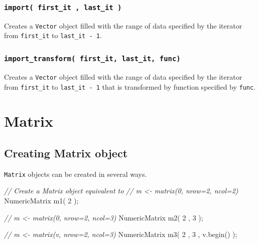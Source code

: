 \documentclass[]{book}
\newenvironment{Shaded}{\begin{snugshade}}{\end{snugshade}}
\newcommand{\CommentTok}[1]{\textcolor[rgb]{0.56,0.35,0.01}{\textit{#1}}}
\newcommand{\DecValTok}[1]{\textcolor[rgb]{0.00,0.00,0.81}{#1}}
\newcommand{\NormalTok}[1]{#1}
\begin{document}
\hypertarget{import-first_it-last_it}{%
\subsection{\texorpdfstring{\texttt{import(\ first\_it\ ,\ last\_it\ )}}{import( first\_it , last\_it )}}\label{import-first_it-last_it}}

Creates a \texttt{Vector} object filled with the range of data specified by the iterator from \texttt{first\_it} to \texttt{last\_it\ -\ 1}.

\hypertarget{import_transform-first_it-last_it-func}{%
\subsection{\texorpdfstring{\texttt{import\_transform(\ first\_it,\ last\_it,\ func)}}{import\_transform( first\_it, last\_it, func)}}\label{import_transform-first_it-last_it-func}}

Creates a \texttt{Vector} object filled with the range of data specified by the iterator from \texttt{first\_it} to \texttt{last\_it\ -\ 1} that is transformed by function specified by \texttt{func}.

\hypertarget{matrix}{%
\chapter{Matrix}\label{matrix}}

\hypertarget{creating-matrix-object}{%
\section{Creating Matrix object}\label{creating-matrix-object}}

\texttt{Matrix} objects can be created in several ways.

\begin{Shaded}
\begin{Highlighting}[]
\CommentTok{// Create a Matrix object equivalent to}
\CommentTok{// m <- matrix(0, nrow=2, ncol=2)}
\NormalTok{NumericMatrix m1( }\DecValTok{2}\NormalTok{ );}

\CommentTok{// m <- matrix(0, nrow=2, ncol=3)}
\NormalTok{NumericMatrix m2( }\DecValTok{2}\NormalTok{ , }\DecValTok{3}\NormalTok{ );}

\CommentTok{// m <- matrix(v, nrow=2, ncol=3)}
\NormalTok{NumericMatrix m3( }\DecValTok{2}\NormalTok{ , }\DecValTok{3}\NormalTok{ , v.begin() );}
\end{Highlighting}
\end{Shaded}
\end{document}
